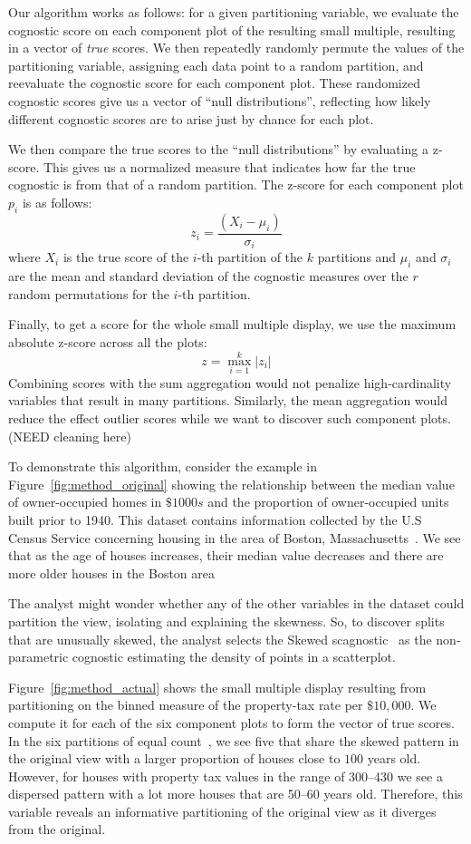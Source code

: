 Our algorithm works as follows: for a given partitioning variable, we evaluate the cognostic score on each component plot of the resulting small multiple, resulting in a vector of \emph{true} scores. We then repeatedly randomly permute the values of the partitioning variable, assigning each data point to a random partition, and reevaluate the cognostic score for each component plot. These randomized cognostic scores give us a vector of ``null distributions'', reflecting how likely different cognostic scores are to arise just by chance for each plot.

We then compare the true scores to the ``null distributions'' by evaluating a z-score. This gives us a normalized measure that indicates how far the true cognostic is from that of a random partition. The z-score for each component plot $p_i$ is as follows:
$$z_i = \frac{(X_i-\mu_i)}{\sigma_i}$$ 
where $X_i$ is the true score of the $i$-th partition of the $k$ partitions and $\mu_i$ and $\sigma_i$ are the mean and standard deviation of the cognostic measures over the $r$ random permutations for the $i$-th partition.

Finally, to get a score for the whole small multiple display, we use the maximum absolute z-score across all the plots: 
$$z = \max_{i=1}^k |z_i|$$ 
Combining scores with the sum aggregation would not penalize high-cardinality variables that result in many partitions. Similarly, the mean aggregation would reduce the effect outlier scores while we want to discover such component plots. (NEED cleaning here)

To demonstrate this algorithm, consider the example in Figure~\ref{fig:method_original} showing the relationship between the median value of owner-occupied homes in $\$1000s$ and the proportion of owner-occupied units built prior to 1940. This dataset contains information collected by the U.S Census Service concerning housing in the area of Boston, Massachusetts~\cite{Harrison1978}. We see that as the age of houses increases, their median value decreases and there are more older houses in the Boston area

The analyst might wonder whether any of the other variables in the dataset could partition the view, isolating and explaining the skewness. So, to discover splits that are unusually skewed, the analyst selects the Skewed scagnostic~\cite{Wilkinson2005} as the non-parametric cognostic estimating the density of points in a scatterplot. 

Figure~\ref{fig:method_actual} shows the small multiple display resulting from partitioning on the binned measure of the property-tax rate per $\$10,000$. We compute it for each of the six component plots to form the vector of true scores. In the six partitions of equal count~\cite{Becker1996}, we see five that share the skewed pattern in the original view with a larger proportion of houses close to $100$ years old. However, for houses with property tax values in the range of 300--430 we see a dispersed pattern with a lot more houses that are 50--60 years old. Therefore, this variable reveals an informative partitioning of the original view as it diverges from the original.


